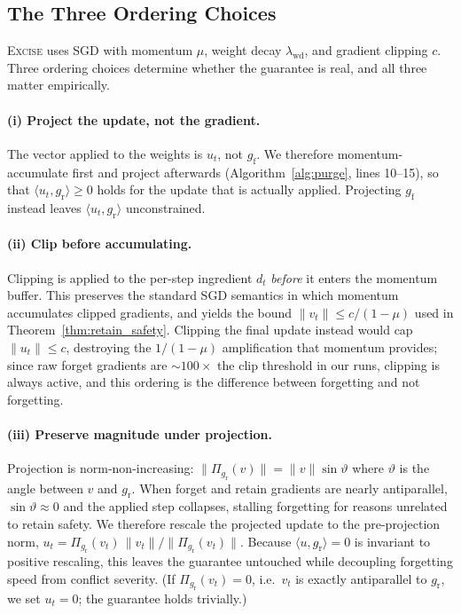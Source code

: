 \documentclass{article}
\newcommand{\ours}{\textsc{Excise}}
\newcommand{\gf}{g_{\mathrm{f}}}
\newcommand{\gr}{g_{\mathrm{r}}}
\theoremstyle{remark}
\theoremstyle{plain}
\begin{document}
\subsection{The Three Ordering Choices}

\ours{} uses SGD with momentum $\mu$, weight decay $\lambda_{\mathrm{wd}}$, and
gradient clipping $c$. Three ordering choices determine whether the guarantee is
real, and all three matter empirically.

\paragraph{(i) Project the update, not the gradient.}
The vector applied to the weights is $u_t$, not $\gf$. We therefore
momentum-accumulate first and project afterwards
(Algorithm~\ref{alg:purge}, lines 10--15), so that
$\langle u_t,\gr\rangle \ge 0$ holds for the update that is actually applied.
Projecting $\gf$ instead leaves $\langle u_t,\gr\rangle$ unconstrained.

\paragraph{(ii) Clip before accumulating.}
Clipping is applied to the per-step ingredient $d_t$ \emph{before} it enters the
momentum buffer. This preserves the standard SGD semantics in which momentum
accumulates clipped gradients, and yields the bound
$\|v_t\| \le c/(1-\mu)$ used in Theorem~\ref{thm:retain_safety}. Clipping the
final update instead would cap $\|u_t\| \le c$, destroying the
$1/(1-\mu)$ amplification that momentum provides; since raw forget gradients are
${\sim}100\times$ the clip threshold in our runs, clipping is always active, and
this ordering is the difference between forgetting and not forgetting.

\paragraph{(iii) Preserve magnitude under projection.}
Projection is norm-non-increasing: $\|\Pi_{\gr}(v)\| = \|v\|\sin\vartheta$ where
$\vartheta$ is the angle between $v$ and $\gr$. When forget and retain gradients
are nearly antiparallel, $\sin\vartheta \approx 0$ and the applied step
collapses, stalling forgetting for reasons unrelated to retain safety. We
therefore rescale the projected update to the pre-projection norm,
$u_t = \Pi_{\gr}(v_t)\,\|v_t\|/\|\Pi_{\gr}(v_t)\|$. Because
$\langle u,\gr\rangle = 0$ is invariant to positive rescaling, this leaves the
guarantee untouched while decoupling forgetting speed from conflict severity.
(If $\Pi_{\gr}(v_t)=0$, i.e.\ $v_t$ is exactly antiparallel to $\gr$, we set
$u_t=0$; the guarantee holds trivially.)
\end{document}
